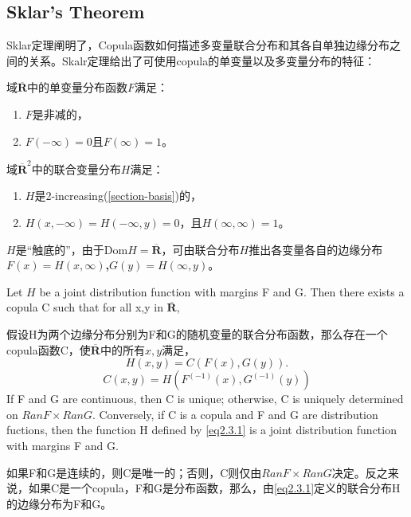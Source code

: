 \subsection{Sklar's Theorem}\cite{Bill2000An}
Sklar定理阐明了，Copula函数如何描述多变量联合分布和其各自单独边缘分布之间的关系。Skalr定理给出了可使用copula的单变量以及多变量分布的特征：
\begin{definition}
    域$\overline{\mathbf{R}}$中的单变量分布函数$F$满足：
    \begin{enumerate}
        \item $F$是非减的，
        \item $F(-\infty) = 0$且$F(\infty) = 1$。
    \end{enumerate}
    \label{def2.3.1}
\end{definition}

\begin{definition}
    域$\overline{\mathbf{R}}^2$中的联合变量分布$H$满足：
    \begin{enumerate}
        \item $H$是2-increasing(\cref{section-basis})的，
        \item $H(x,-\infty) = H(-\infty,y) = 0$，且$H(\infty,\infty) = 1$。
    \end{enumerate}
    $H$是``触底的''，由于Dom$H = \overline{\mathbf{R}}$，可由联合分布$H$推出各变量各自的边缘分布\textbf{\textcolor[rgb]{1,0,0}{$F(x) = H(x,\infty)$,$G(y) = H(\infty,y)$}}。
    \label{def2.3.2}
\end{definition}

\begin{theorem}[\textbf{\textcolor[rgb]{1,0,0}{Sklar's Theorem}}]
    Let $H$ be a joint distribution function with margins F and G. Then there exists a copula C such that for all x,y in $\overline{\mathbf{R}}$,

    假设H为两个边缘分布分别为F和G的随机变量的联合分布函数，那么存在一个copula函数C，使$\overline{\mathbf{R}}$中的所有$x,y$满足，
    \begin{equation}
        H(x,y) = C(F(x),G(y)).
        \label{eq2.3.1}
    \end{equation}
    \begin{equation}
        C(x,y) = H(F^{(-1)}(x),G^{(-1)}(y))
        \label{eq2.3.3}
    \end{equation}
    If F and G are continuous, then C is unique; otherwise, C is uniquely determined on $RanF\times RanG$. Conversely, if C is a copula and F and G are distribution fuctions, then the function H defined by \cref{eq2.3.1} is a joint distribution function with margins F and G.
   
    如果F和G是连续的，则C是唯一的；否则，C则仅由$RanF\times RanG$决定。反之来说，如果C是一个copula，F和G是分布函数，那么，由\cref{eq2.3.1}定义的联合分布H的边缘分布为F和G。
    \label{thr-sklar}
\end{theorem}

